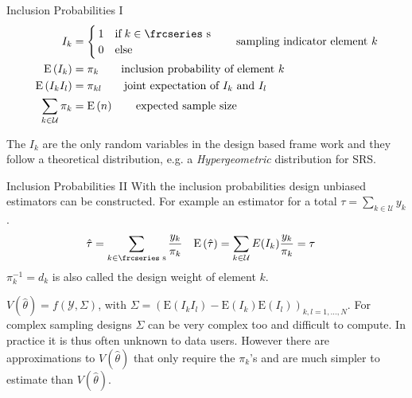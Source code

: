\documentclass{beamer}\usepackage[]{graphicx}\usepackage[]{color}
\newcommand{\eqname}[1]{\tag*{#1}} %
\newcommand{\textfrc}[1]{{\frcseries#1}}
\newcommand{\mathfrc}[1]{\text{\textfrc{#1}}}
\newcommand{\E}[1]{\text{E}\left(#1\right)}
\begin{document}
\begin{frame}{Inclusion Probabilities I}
\begin{align}
 I_k   &=   \begin{cases}   1  & \text{if}\; k \in \mathfrc{s} \\
                            0  & \text{else}  
          \end{cases}   \eqname{sampling indicator element $k$} \\
\E{I_k}     &  =   \pi_k    \eqname{inclusion probability of element $k$ } \\
\E{I_k I_l} &  =   \pi_{kl}  \eqname{joint expectation of $I_k$ and $I_l$} \\
\sum_{k \in \mathcal{U}}\pi_k & = \E{n} \eqname{expected sample size}
\end{align}

The $I_k$ are the \alert{only} random variables in the design based frame work and they follow a theoretical distribution, e.g. a \emph{Hypergeometric} distribution for SRS. 

\end{frame}


\begin{frame}{Inclusion Probabilities II}
With the inclusion probabilities design unbiased estimators can be constructed. For example an estimator for a total $\tau=\sum_{k \in \mathcal{U}} y_k$.
\begin{align*}
 \hat\tau &= \sum_{k \in \mathfrc{s}} \dfrac{y_k}{\pi_k} & \E{\hat\tau } &= \sum_{k \in \mathcal{U}} E(I_k) \dfrac{y_k}{\pi_k} = \tau
\end{align*}
$\pi_k^{-1}=d_k$ is also called the \alert{design weight} of element $k$.

$V(\hat\theta)=f(\mathcal{Y},\Sigma)$, with $\Sigma=(\E{I_k I_l}-\E{I_k} \E{I_l})_{k,l=1,\ldots,N}$.
For complex sampling designs $\Sigma$ can be very complex too and difficult to compute. In practice it is thus often unknown to data users. However there are approximations to $V(\hat\theta)$ that only require the $\pi_k$'s and are much simpler to estimate than $V(\hat\theta)$.

\end{frame}
\end{document}
